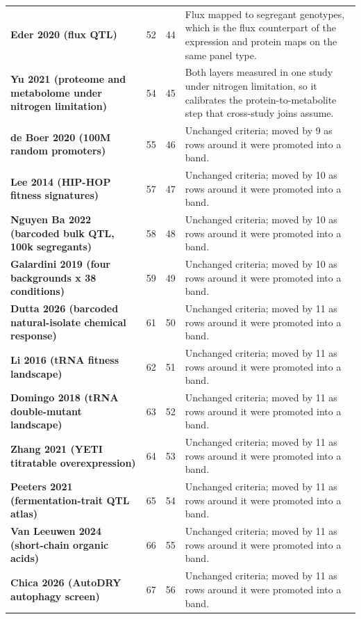 \begin{longtable}{@{}L{46mm} r@{\hspace{6pt}} r@{\hspace{6pt}} L{104mm}@{}}
\addlinespace[5pt]
\textbf{Eder 2020 (flux QTL)} & 52 & 44 & Flux mapped to segregant genotypes, which is the flux counterpart of the expression and protein maps on the same panel type. \\
\addlinespace[5pt]
\textbf{Yu 2021 (proteome and metabolome under nitrogen limitation)} & 54 & 45 & Both layers measured in one study under nitrogen limitation, so it calibrates the protein-to-metabolite step that cross-study joins assume. \\
\addlinespace[5pt]
\textbf{de Boer 2020 (100M random promoters)} & 55 & 46 & Unchanged criteria; moved by 9 as rows around it were promoted into a band. \\
\addlinespace[5pt]
\textbf{Lee 2014 (HIP-HOP fitness signatures)} & 57 & 47 & Unchanged criteria; moved by 10 as rows around it were promoted into a band. \\
\addlinespace[5pt]
\textbf{Nguyen Ba 2022 (barcoded bulk QTL, 100k segregants)} & 58 & 48 & Unchanged criteria; moved by 10 as rows around it were promoted into a band. \\
\addlinespace[5pt]
\textbf{Galardini 2019 (four backgrounds x 38 conditions)} & 59 & 49 & Unchanged criteria; moved by 10 as rows around it were promoted into a band. \\
\addlinespace[5pt]
\textbf{Dutta 2026 (barcoded natural-isolate chemical response)} & 61 & 50 & Unchanged criteria; moved by 11 as rows around it were promoted into a band. \\
\addlinespace[5pt]
\textbf{Li 2016 (tRNA fitness landscape)} & 62 & 51 & Unchanged criteria; moved by 11 as rows around it were promoted into a band. \\
\addlinespace[5pt]
\textbf{Domingo 2018 (tRNA double-mutant landscape)} & 63 & 52 & Unchanged criteria; moved by 11 as rows around it were promoted into a band. \\
\addlinespace[5pt]
\textbf{Zhang 2021 (YETI titratable overexpression)} & 64 & 53 & Unchanged criteria; moved by 11 as rows around it were promoted into a band. \\
\addlinespace[5pt]
\textbf{Peeters 2021 (fermentation-trait QTL atlas)} & 65 & 54 & Unchanged criteria; moved by 11 as rows around it were promoted into a band. \\
\addlinespace[5pt]
\textbf{Van Leeuwen 2024 (short-chain organic acids)} & 66 & 55 & Unchanged criteria; moved by 11 as rows around it were promoted into a band. \\
\addlinespace[5pt]
\textbf{Chica 2026 (AutoDRY autophagy screen)} & 67 & 56 & Unchanged criteria; moved by 11 as rows around it were promoted into a band. \\

\end{longtable}
